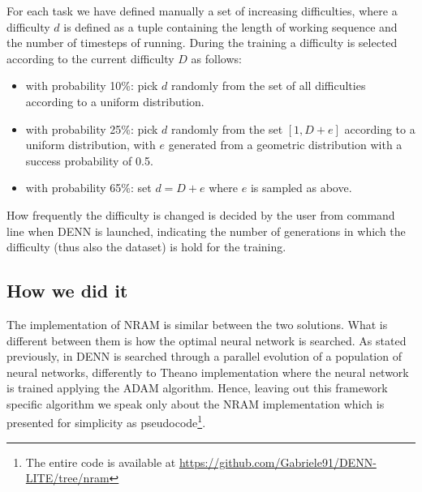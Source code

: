 For each task we have defined manually a set of increasing difficulties, where a difficulty $d$ is defined as a tuple containing the length of working sequence and the number of timesteps of running. During the training a difficulty is selected according to the current difficulty $D$ as follows:
\begin{itemize}
	\item{with probability 10\%: pick $d$ randomly from the set of all difficulties according to a uniform distribution.}
	\item{with probability 25\%: pick $d$ randomly from the set $[1, D + e]$ according to a uniform distribution, with $e$ generated from a geometric distribution with a success probability of 0.5.}
	\item{with probability 65\%: set $d = D + e$ where $e$ is sampled as above.}
\end{itemize}
How frequently the difficulty is changed is decided by the user from command line when DENN is launched, indicating the number of generations in which the difficulty (thus also the dataset) is hold for the training.

\subsection{How we did it}
The implementation of NRAM is similar between the two solutions. What is different between them is how the optimal neural network is searched. As stated previously, in DENN is searched through a parallel evolution of a population of neural networks, differently to Theano implementation where the neural network is trained applying the ADAM algorithm. Hence, leaving out this framework specific algorithm we speak only about the NRAM implementation which is presented for simplicity as pseudocode\footnote{The entire code is available at \href{https://github.com/Gabriele91/DENN-LITE/tree/nram}{https://github.com/Gabriele91/DENN-LITE/tree/nram}}.

